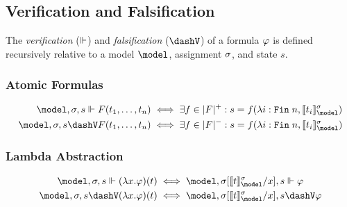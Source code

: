 \documentclass[../LogosReference.tex]{subfiles}
\begin{document}

\subsection{Verification and Falsification}\label{sec:verification-falsification}


The \emph{verification} ($\Vdash$) and \emph{falsification} ($\falsifies$) of a formula $\varphi$ is defined recursively relative to a model $\model$, assignment $\sigma$, and state $s$.

\subsubsection{Atomic Formulas}\label{sec:atomic-formulas}

\begin{definition}\label{def:atomic-verification}
	\begin{align}
		\model, \assignment, s \verifies F(t_1, \ldots, t_n)  & \iff \exists f \in \verifiertype{F} : s = f(\lambda i : \Fin\;n, \sem{t_i}^\assignment_\model)  \\
		\model, \assignment, s \falsifies F(t_1, \ldots, t_n) & \iff \exists f \in \falsifiertype{F} : s = f(\lambda i : \Fin\;n, \sem{t_i}^\assignment_\model)
	\end{align}
\end{definition}

\subsubsection{Lambda Abstraction}\label{sec:lambda-abstraction}

\begin{definition}\label{def:lambda-verification}
	\begin{align}
		\model, \assignment, s \verifies (\lambda x.\metaA)(t)  & \iff \model, \assignsub{\sem{t}^\assignment_\model}{x}, s \verifies \metaA  \\
		\model, \assignment, s \falsifies (\lambda x.\metaA)(t) & \iff \model, \assignsub{\sem{t}^\assignment_\model}{x}, s \falsifies \metaA
	\end{align}
\end{definition}
\end{document}
